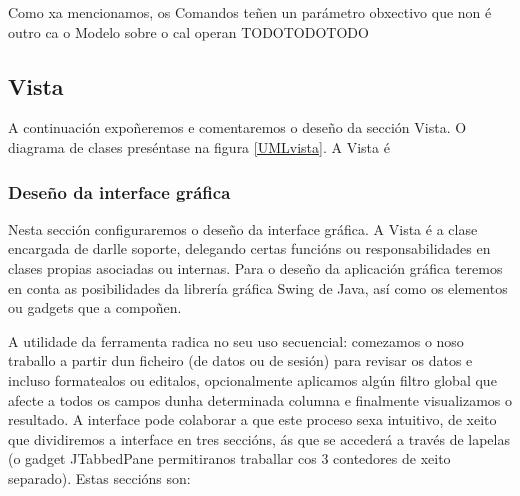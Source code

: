 Como xa mencionamos, os Comandos teñen un parámetro obxectivo que non é outro ca o Modelo sobre o cal operan TODOTODOTODO

\subsection{Vista}

A continuación expoñeremos e comentaremos o deseño da sección Vista. O diagrama de clases preséntase na figura \ref{UMLvista}. A Vista é

\subsubsection{Deseño da interface gráfica}

Nesta sección configuraremos o deseño da interface gráfica. A Vista é a clase encargada de darlle soporte, delegando certas funcións ou responsabilidades en clases propias asociadas ou internas. Para o deseño da aplicación gráfica teremos en conta as posibilidades da librería gráfica Swing de Java, así como os elementos ou gadgets que a compoñen. 

A utilidade da ferramenta radica no seu uso secuencial: comezamos o noso traballo a partir dun ficheiro (de datos ou de sesión) para revisar os datos e incluso formatealos ou editalos, opcionalmente aplicamos algún filtro global que afecte a todos os campos dunha determinada columna e finalmente visualizamos o resultado. A interface pode colaborar a que este proceso sexa intuitivo, de xeito que dividiremos a interface en tres seccións, ás que se accederá a través de lapelas (o gadget JTabbedPane permitiranos traballar cos 3 contedores de xeito separado). Estas seccións son:

